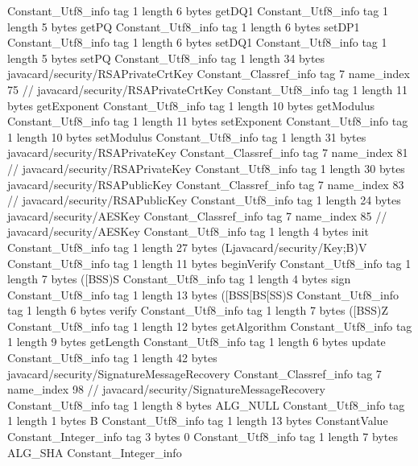 {{{		}
		Constant_Utf8_info {
			tag	1
			length	6
			bytes	getDQ1
		}
		Constant_Utf8_info {
			tag	1
			length	5
			bytes	getPQ
		}
		Constant_Utf8_info {
			tag	1
			length	6
			bytes	setDP1
		}
		Constant_Utf8_info {
			tag	1
			length	6
			bytes	setDQ1
		}
		Constant_Utf8_info {
			tag	1
			length	5
			bytes	setPQ
		}
		Constant_Utf8_info {
			tag	1
			length	34
			bytes	javacard/security/RSAPrivateCrtKey
		}
		Constant_Classref_info {
			tag	7
			name_index	75		// javacard/security/RSAPrivateCrtKey
		}
		Constant_Utf8_info {
			tag	1
			length	11
			bytes	getExponent
		}
		Constant_Utf8_info {
			tag	1
			length	10
			bytes	getModulus
		}
		Constant_Utf8_info {
			tag	1
			length	11
			bytes	setExponent
		}
		Constant_Utf8_info {
			tag	1
			length	10
			bytes	setModulus
		}
		Constant_Utf8_info {
			tag	1
			length	31
			bytes	javacard/security/RSAPrivateKey
		}
		Constant_Classref_info {
			tag	7
			name_index	81		// javacard/security/RSAPrivateKey
		}
		Constant_Utf8_info {
			tag	1
			length	30
			bytes	javacard/security/RSAPublicKey
		}
		Constant_Classref_info {
			tag	7
			name_index	83		// javacard/security/RSAPublicKey
		}
		Constant_Utf8_info {
			tag	1
			length	24
			bytes	javacard/security/AESKey
		}
		Constant_Classref_info {
			tag	7
			name_index	85		// javacard/security/AESKey
		}
		Constant_Utf8_info {
			tag	1
			length	4
			bytes	init
		}
		Constant_Utf8_info {
			tag	1
			length	27
			bytes	(Ljavacard/security/Key;B)V
		}
		Constant_Utf8_info {
			tag	1
			length	11
			bytes	beginVerify
		}
		Constant_Utf8_info {
			tag	1
			length	7
			bytes	([BSS)S
		}
		Constant_Utf8_info {
			tag	1
			length	4
			bytes	sign
		}
		Constant_Utf8_info {
			tag	1
			length	13
			bytes	([BSS[BS[SS)S
		}
		Constant_Utf8_info {
			tag	1
			length	6
			bytes	verify
		}
		Constant_Utf8_info {
			tag	1
			length	7
			bytes	([BSS)Z
		}
		Constant_Utf8_info {
			tag	1
			length	12
			bytes	getAlgorithm
		}
		Constant_Utf8_info {
			tag	1
			length	9
			bytes	getLength
		}
		Constant_Utf8_info {
			tag	1
			length	6
			bytes	update
		}
		Constant_Utf8_info {
			tag	1
			length	42
			bytes	javacard/security/SignatureMessageRecovery
		}
		Constant_Classref_info {
			tag	7
			name_index	98		// javacard/security/SignatureMessageRecovery
		}
		Constant_Utf8_info {
			tag	1
			length	8
			bytes	ALG_NULL
		}
		Constant_Utf8_info {
			tag	1
			length	1
			bytes	B
		}
		Constant_Utf8_info {
			tag	1
			length	13
			bytes	ConstantValue
		}
		Constant_Integer_info {
			tag	3
			bytes	0
		}
		Constant_Utf8_info {
			tag	1
			length	7
			bytes	ALG_SHA
		}
		Constant_Integer_info {
}}}
